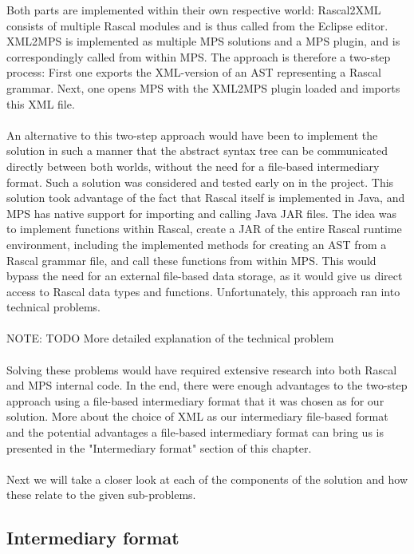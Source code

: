 \documentclass[a4paper, 11pt]{article}
\begin{document}
Both parts are implemented within their own respective world: Rascal2XML consists of multiple Rascal modules and is thus called from the Eclipse editor. XML2MPS is implemented as multiple MPS solutions and a MPS plugin, and is correspondingly called from within MPS. The approach is therefore a two-step process: First one exports the XML-version of an AST representing a Rascal grammar. Next, one opens MPS with the XML2MPS plugin loaded and imports this XML file. 
\\\\ 
An alternative to this two-step approach would have been to implement the solution in such a manner that the abstract syntax tree can be communicated directly between both worlds, without the need for a file-based intermediary format. Such a solution was considered and tested early on in the project. This solution took advantage of the fact that Rascal itself is implemented in Java, and MPS has native support for importing and calling Java JAR files. The idea was to implement functions within Rascal, create a JAR of the entire Rascal runtime environment, including the implemented methods for creating an AST from a Rascal grammar file, and call these functions from within MPS. This would bypass the need for an external file-based data storage, as it would give us direct access to Rascal data types and functions. Unfortunately, this approach ran into technical problems.
\\\\
NOTE: TODO More detailed explanation of the technical problem 
\\\\
Solving these problems would have required extensive research into both Rascal and MPS internal code. In the end, there were enough advantages to the two-step approach using a file-based intermediary format that it was chosen as for our solution. More about the choice of XML as our intermediary file-based format and the potential advantages a file-based intermediary format can bring us is presented in the "Intermediary format" section of this chapter.
\\\\
Next we will take a closer look at each of the components of the solution and how these relate to the given sub-problems.
\subsection{Intermediary format}
\end{document}
